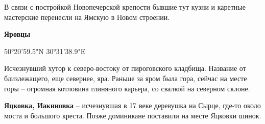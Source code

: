 В связи с постройкой Новопечерской крепости бывшие тут кузни и каретные мастерские перенесли на Ямскую в Новом строении.\\

\medskip

\textbf{Яровцы} 

50°20'59.5"N 30°31'38.9"E

Исчезнувший хутор к северо-востоку от пироговского кладбища. Название от близлежащего, еще севернее, яра. Раньше за яром была гора, сейчас на месте горы – огромная котловина глиняного карьера, со свалкой на северном склоне.\\

\medskip

\textbf{Яцковка, Иакиновка} – исчезнувшая в 17 веке деревушка на Сырце, где-то около моста и большого креста. Позже доминикане поставили на месте Яцковки шинок.